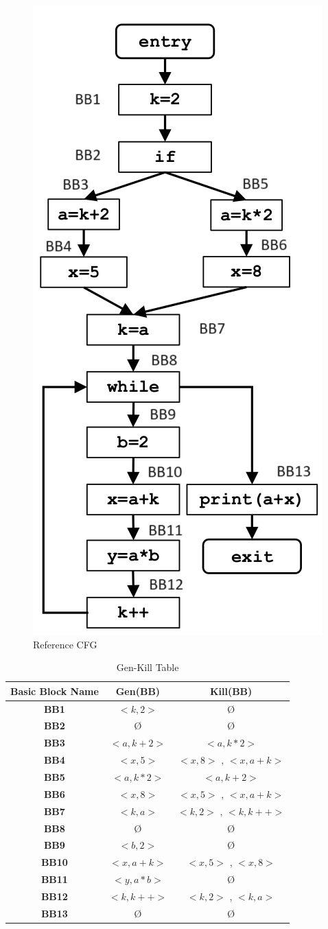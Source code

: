 \documentclass[a4paper,12pt,numbers=noenddot]{scrreprt}
\begin{document}
        \begin{figure}[H]
            \centering
            \includegraphics[width=0.25\linewidth]{assets/cp.png}
            \caption{Reference CFG}
            \label{fig:cp_iteration_image}
        \end{figure}

        \begin{table}[H]
            \centering
            \begin{tabular}{|c|c|c|}
                \hline
                \textbf{Basic Block Name} & \textbf{Gen(BB)} & \textbf{Kill(BB)} \\
                \hline
                \textbf{BB1}  & $<k, 2>$ & Ø \\
                \textbf{BB2}  & Ø & Ø \\
                \textbf{BB3}  & $<a, k+2>$ & $<a, k*2>$ \\
                \textbf{BB4}  & $<x, 5>$ & $<x, 8>$ , $<x, a+k>$ \\
                \textbf{BB5}  & $<a , k*2>$ & $<a, k+2>$ \\
                \textbf{BB6}  & $<x, 8>$ & $<x, 5>$ , $<x, a+k>$ \\
                \textbf{BB7}  & $<k, a>$ & $<k, 2>$ , $<k, k++>$ \\
                \textbf{BB8}  & Ø & Ø \\
                \textbf{BB9}  & $<b, 2>$ & Ø \\
                \textbf{BB10} & $<x, a+k>$ & $<x, 5>$ , $<x , 8>$ \\
                \textbf{BB11} & $<y, a*b>$ & Ø \\
                \textbf{BB12} & $<k, k++>$ & $<k, 2>$ , $<k, a>$ \\
                \textbf{BB13} & Ø & Ø \\
                \hline
            \end{tabular}
            \caption{Gen-Kill Table}
            \label{tab:cp_gen_kill_table}
        \end{table}
\end{document}

